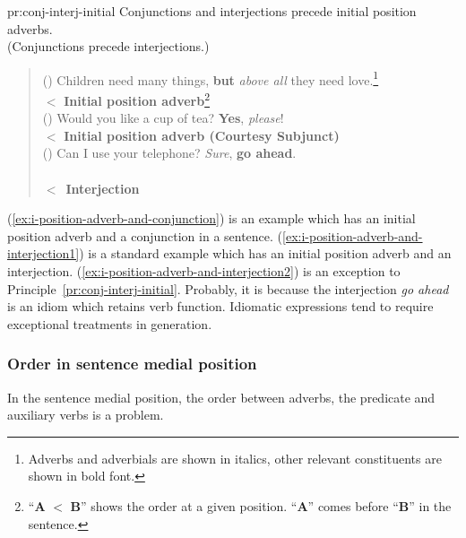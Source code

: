 \begin{pr}{pr:conj-interj-initial}{}
  Conjunctions and interjections precede initial position adverbs. \\
  (Conjunctions precede  interjections.)
\end{pr}
\begin{quote}
 \small
 ()
 Children need many things, {\bf but} {\em above all} they need
 love.\footnote{Adverbs and adverbials are shown in italics, other
   relevant constituents are shown in bold font.}  \\
 \hspace{1cm}{\bf Conjunction} $<$  {\bf Initial position adverb}\footnote
{``{\bf A} $<$ {\bf B}'' shows the order at a given position. 
 ``{\bf A}'' comes before ``{\bf B}'' in the sentence.}\\
 ()
 Would you like a cup of tea? {\bf Yes}, {\em please}! \\
 \hspace{1cm}{\bf Interjection} $<$  
 {\bf Initial position adverb (Courtesy Subjunct)}\\
 ()
Can I use your telephone? {\em Sure}, {\bf go ahead}. \\
 \hspace{2cm}{\bf Initial position adverb (Content Disjunct with degree of truth)} \\
 \hspace{2cm} $<$~{\bf Interjection}
\end{quote}

 (\ref{ex:i-position-adverb-and-conjunction}) 
is an example which has an initial position adverb and a conjunction in 
a sentence.  
(\ref{ex:i-position-adverb-and-interjection1}) is a standard example 
which has an initial position adverb and an interjection.
(\ref{ex:i-position-adverb-and-interjection2}) is an exception to
Principle~\ref{pr:conj-interj-initial}.  Probably, it is because the
interjection {\it go ahead\/} is an idiom which retains verb
function. Idiomatic expressions tend to require exceptional 
treatments in generation.

\subsubsection{Order in sentence medial position}

In the sentence medial position, the order between adverbs, the predicate and
auxiliary verbs is a problem.


